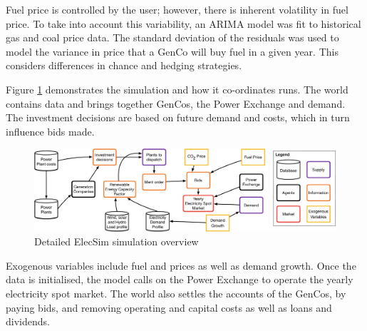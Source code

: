 Fuel price is controlled by the user; however, there is inherent volatility in fuel price. To take into account this variability, an ARIMA \cite{ARIMA} model was fit to historical gas and coal price data. The standard deviation of the residuals was used to model the variance in price that a GenCo will buy fuel in a given year. This considers differences in chance and hedging strategies.



Figure \ref{fig:lowlevelsystem} demonstrates the simulation and how it co-ordinates runs. The world contains data and brings together GenCos, the Power Exchange and demand. The investment decisions are based on future demand and costs, which in turn influence bids made.

\begin{landscape}
	\begin{figure}
		\centering
		\includegraphics[width=\linewidth]{Chapter4/figures/low_level_system}
		\caption{Detailed ElecSim simulation overview}
		\label{fig:lowlevelsystem}
	\end{figure}
\end{landscape}

Exogenous variables include fuel and  prices as well as demand growth. Once the data is initialised, the model calls on the Power Exchange to operate the yearly electricity spot market. The world also settles the accounts of the GenCos, by paying bids, and removing operating and capital costs as well as loans and dividends.







